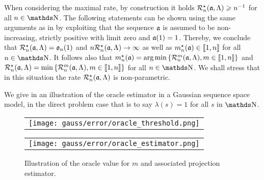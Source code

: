 \begin{rem*}
When considering the maximal rate, by construction it holds 
$\mnRa{\xdfCw[],\Lambda}\geq \ssY^{-1}$ for all $\ssY\in\N$.
The following statements can be
shown using the same arguments as in 
by exploiting that the sequence $\xdfCw[]$ is assumed to be
non-increasing, strictly positive with limit zero and $\xdfCw[(1)]=1$. 
Thereby, we conclude that 
$\mnRa{\xdfCw[],\Lambda}=\mathfrak{o}_{n}(1)$ and $\ssY\mnRa{\xdfCw[],\Lambda}\to\infty$ as well as 
$\mnDi(\xdfCw[])\in\nset{1,\ssY}$ for all $\ssY\in\N$. It follows also that
$\mnDi(\xdfCw[])=\argmin\Nset[{\Di\in\nset{1,n}}]{\dRa{\Di}{\xdfCw[],\Lambda}}$ and 
$\mnRa{\xdfCw[],\Lambda}=\min\Nset[{\Di\in\nset{1,n}}]{\dRa{\Di}{\xdfCw[],\Lambda}}$ for all
$\ssY\in\N$. We shall stress that in this situation the rate
$\mnRa{\xdfCw[],\Lambda}$ is non-parametric.
\remEnd
\end{rem*}

We give in  an illustration of the oracle estimator in a Gaussian sequence space model, in the direct problem case that is to say $\lambda(s) = 1$ for all $s$ in $\N$.

\begin{figure}
  \centering
  \begin{tabular}{@{}c@{}}
    \texttt{[image: gauss/error/oracle\_threshold.png]} \\[\abovecaptionskip]
  \end{tabular}
  \begin{tabular}{@{}c@{}}
    \texttt{[image: gauss/error/oracle\_estimator.png]} \\[\abovecaptionskip]
  \end{tabular}
  \caption{Illustration of the oracle value for $m$ and associated projection estimator.}\label{igssm:oracle}
\end{figure}

